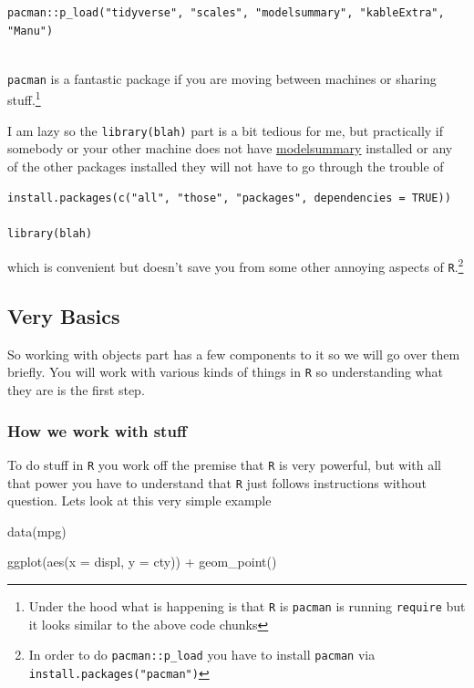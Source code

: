 \documentclass[]{tufte-handout}
\newenvironment{Shaded}{}{}
\newcommand{\AttributeTok}[1]{\textcolor[rgb]{0.49,0.56,0.16}{#1}}
\newcommand{\FunctionTok}[1]{\textcolor[rgb]{0.02,0.16,0.49}{#1}}
\newcommand{\NormalTok}[1]{#1}
\newcommand{\SpecialCharTok}[1]{\textcolor[rgb]{0.25,0.44,0.63}{#1}}
\begin{document}
\begin{verbatim}
pacman::p_load("tidyverse", "scales", "modelsummary", "kableExtra", "Manu")


\end{verbatim}

\texttt{pacman} is a fantastic package if you are moving between
machines or sharing stuff.\footnote{Under the hood what is happening is
  that \texttt{R} is \texttt{pacman} is running \texttt{require} but it
  looks similar to the above code chunks}

I am lazy so the \texttt{library(blah)} part is a bit tedious for me,
but practically if somebody or your other machine does not have
\href{https://vincentarelbundock.github.io/modelsummary/index.html}{modelsummary}
installed or any of the other packages installed they will not have to
go through the trouble of

\begin{verbatim}
install.packages(c("all", "those", "packages", dependencies = TRUE))

library(blah)
\end{verbatim}

which is convenient but doesn't save you from some other annoying
aspects of \texttt{R}.\footnote{In order to do \texttt{pacman::p\_load}
  you have to install \texttt{pacman} via
  \texttt{install.packages("pacman")}}

\hypertarget{very-basics}{%
\subsection{Very Basics}\label{very-basics}}

So working with objects part has a few components to it so we will go
over them briefly. You will work with various kinds of things in
\texttt{R} so understanding what they are is the first step.

\hypertarget{how-we-work-with-stuff}{%
\subsubsection{How we work with stuff}\label{how-we-work-with-stuff}}

To do stuff in \texttt{R} you work off the premise that \texttt{R} is
very powerful, but with all that power you have to understand that
\texttt{R} just follows instructions without question. Lets look at this
very simple example

\begin{Shaded}
\begin{Highlighting}[]
\FunctionTok{data}\NormalTok{(mpg)}

\FunctionTok{ggplot}\NormalTok{(}\FunctionTok{aes}\NormalTok{(}\AttributeTok{x =}\NormalTok{ displ, }\AttributeTok{y =}\NormalTok{ cty)) }\SpecialCharTok{+}
  \FunctionTok{geom\_point}\NormalTok{()}
\end{Highlighting}
\end{Shaded}
\end{document}
